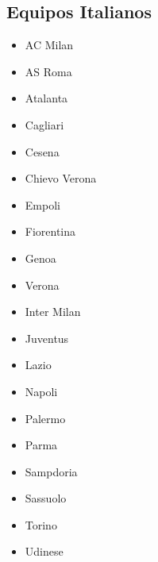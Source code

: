 \subsection{Equipos Italianos}\label{sec:equipos-ita}
\begin{multicols}{2}
	\begin{itemize}
	    \setlength{\itemsep}{1pt}
	    \setlength{\parskip}{0pt}
	    \setlength{\parsep}{0pt}
		\item AC Milan
		\item AS Roma
		\item Atalanta
		\item Cagliari
		\item Cesena
		\item Chievo Verona
		\item Empoli
		\item Fiorentina
		\item Genoa
		\item Verona
		\item Inter Milan
		\item Juventus
		\item Lazio
		\item Napoli
		\item Palermo
		\item Parma
		\item Sampdoria
		\item Sassuolo
		\item Torino
		\item Udinese
	\end{itemize}
\end{multicols}

